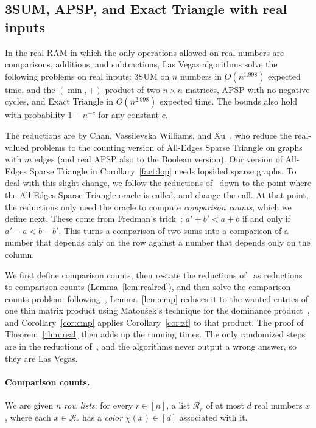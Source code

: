\subsection{3SUM, APSP, and Exact Triangle with real inputs}\label{sec:real}

\begin{theorem}\label{thm:real}
In the real RAM in which the only operations allowed on real numbers are comparisons, additions, and subtractions, Las Vegas algorithms solve the following problems on real inputs: $3$SUM on $n$ numbers in $O(n^{1.998})$ expected time, and the $(\min,+)$-product of two $n\times n$ matrices, APSP with no negative cycles, and Exact Triangle in $O(n^{2.998})$ expected time. The bounds also hold with probability $1-n^{-c}$ for any constant $c$.
\end{theorem}

The reductions are by Chan, Vassilevska Williams, and Xu~\cite{CVX22}, who reduce the real-valued problems to the counting version of All-Edges Sparse Triangle on graphs with $m$ edges (and real APSP also to the Boolean version). Our version of All-Edges Sparse Triangle in Corollary~\ref{fact:lop} needs lopsided sparse graphs.
To deal with this slight change, we follow the reductions of~\cite{CVX22} down to the point where the All-Edges Sparse Triangle oracle is called, and change the call. At that point, the reductions only need the oracle to compute \emph{comparison counts}, which we define next. These come from Fredman's trick~\cite{Fre76}: $a'+b'<a+b$ if and only if $a'-a<b-b'$. This turns a comparison of two sums into a comparison of a number that depends only on the row against a number that depends only on the column.

{We first define comparison counts, then restate the reductions of~\cite{CVX22} as reductions to comparison counts (Lemma~\ref{lem:realred}), and then solve the comparison counts problem: following~\cite{CVX22}, Lemma~\ref{lem:cmp} reduces it to the wanted entries of one thin matrix product using Matou\v sek's technique for the dominance product~\cite{Mat91}, and Corollary~\ref{cor:cmp} applies Corollary~\ref{cor:zt} to that product.} The proof of Theorem~\ref{thm:real} then adds up the running times. The only randomized steps are in the reductions of~\cite{CVX22}, and the algorithms never output a wrong answer, so they are Las Vegas.

\paragraph{Comparison counts.}
We are given $n$ \emph{row lists}: for every $r\in[n]$, a list $\mathcal R_r$ of at most $d$ real numbers $x$, where each $x\in\mathcal R_r$ has a \emph{color} $\chi(x)\in[d]$ associated with it.

